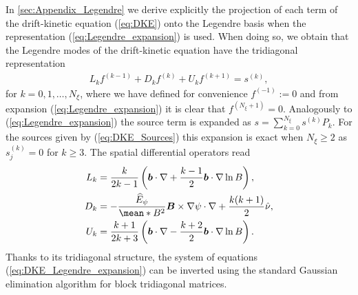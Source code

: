 \documentclass[10pt]{iopart}
\begin{document}
In \ref{sec:Appendix_Legendre} we derive explicitly the projection of each term of the drift-kinetic equation (\ref{eq:DKE}) onto the Legendre basis when the representation (\ref{eq:Legendre_expansion}) is used. When doing so, we obtain that the Legendre modes of the drift-kinetic equation have the tridiagonal representation  
%
\begin{align}
	L_k f^{(k-1)} + D_k f^{(k)} + U_k f^{(k+1)} = s^{(k)},  
	\label{eq:DKE_Legendre_expansion}
\end{align}
for $k=0,1,\ldots ,N_\xi$, where we have defined for convenience $f^{(-1)}:=0$ and from expansion (\ref{eq:Legendre_expansion}) it is clear that $f^{(N_\xi+1)}=0$. Analogously to (\ref{eq:Legendre_expansion}) the source term is expanded as $s=\sum_{k=0}^{N_\xi} s^{(k)} P_k$. For the sources given by (\ref{eq:DKE_Sources}) this expansion is exact when $N_\xi\ge2$ as $s_j^{(k)}=0$ for $k\ge 3$. The spatial differential operators read 
%
\begin{align}
	L_k & = 
	\frac{k}{2k-1} 
	\left(
	\vb*{b} \cdot \nabla 
	+
	\frac{k-1}{2}
	\vb*{b}\cdot\nabla \ln B
	\right), \label{eq:DKE_Legendre_expansion_Lower}
	\\ 
	D_k & = - 
	\frac{\widehat{E}_\psi}{\mean*{B^2}}
	\vb*{B}\times \nabla\psi  \cdot \nabla 
	+  
	\frac{k(k+1)}{2}
	\hat{\nu} , \label{eq:DKE_Legendre_expansion_Diagonal}
	\\
	U_k & =  
	\frac{k+1}{2k+3} 
	\left(
	\vb*{b} \cdot \nabla 
	-
	\frac{k+2}{2}
	\vb*{b}\cdot\nabla \ln B
	\right). \label{eq:DKE_Legendre_expansion_Upper}
\end{align}
Thanks to its tridiagonal structure, the system of equations (\ref{eq:DKE_Legendre_expansion}) can be inverted using the standard Gaussian elimination algorithm for block tridiagonal matrices. 
\end{document}
